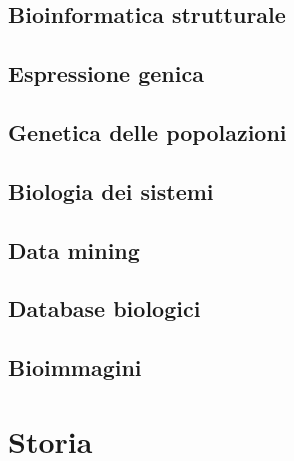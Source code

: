 \subsection{Bioinformatica strutturale}
\subsection{Espressione genica}
\subsection{Genetica delle popolazioni}
\subsection{Biologia dei sistemi}
\subsection{Data mining}
\subsection{Database biologici} %
\subsection{Bioimmagini}



\section{Storia}
